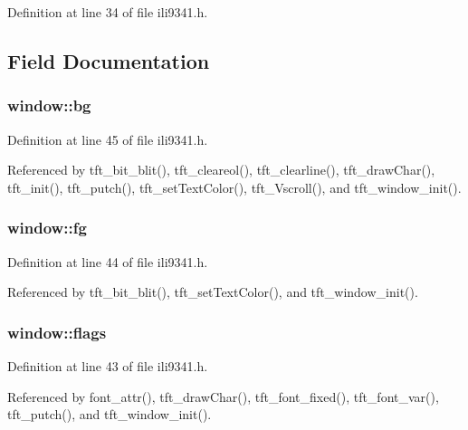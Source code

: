Definition at line 34 of file ili9341.\-h.



\subsection{Field Documentation}
\hypertarget{structwindow_affcf5d29153103c2537542f5a4f8ba87}{
\subsubsection[{bg}]{ window\-::bg}}\label{structwindow_affcf5d29153103c2537542f5a4f8ba87}


Definition at line 45 of file ili9341.\-h.



Referenced by tft\-\_\-bit\-\_\-blit(), tft\-\_\-cleareol(), tft\-\_\-clearline(), tft\-\_\-draw\-Char(), tft\-\_\-init(), tft\-\_\-putch(), tft\-\_\-set\-Text\-Color(), tft\-\_\-\-Vscroll(), and tft\-\_\-window\-\_\-init().

\hypertarget{structwindow_ac8739cdb3c50efcc1deaa5ab955a5e62}{
\subsubsection[{fg}]{ window\-::fg}}\label{structwindow_ac8739cdb3c50efcc1deaa5ab955a5e62}


Definition at line 44 of file ili9341.\-h.



Referenced by tft\-\_\-bit\-\_\-blit(), tft\-\_\-set\-Text\-Color(), and tft\-\_\-window\-\_\-init().

\hypertarget{structwindow_ad58fae853f87093ef4f0139df0a3f33d}{
\subsubsection[{flags}]{ window\-::flags}}\label{structwindow_ad58fae853f87093ef4f0139df0a3f33d}


Definition at line 43 of file ili9341.\-h.



Referenced by font\-\_\-attr(), tft\-\_\-draw\-Char(), tft\-\_\-font\-\_\-fixed(), tft\-\_\-font\-\_\-var(), tft\-\_\-putch(), and tft\-\_\-window\-\_\-init().

